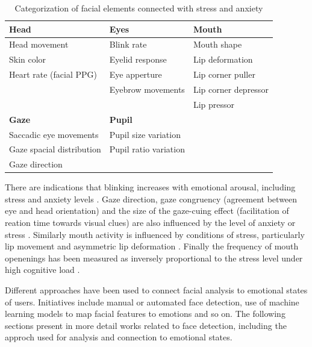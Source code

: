 \begin{table}[h]
\caption{Categorization of facial elements connected with stress and anxiety \parencite{giannakakis2017stress}}
\label{table:stress-facial-features}
\begin{tabular}{lll}%
\toprule%
\textbf{Head} & \textbf{Eyes} & \textbf{Mouth} \\
\midrule
Head movement & Blink rate & Mouth shape \\
Skin color & Eyelid response & Lip deformation  \\
Heart rate (facial PPG) & Eye apperture & Lip corner puller \\
& Eyebrow movements & Lip corner depressor \\
& & Lip pressor \\
\midrule
\textbf{Gaze} & \textbf{Pupil} & \\
\midrule
Saccadic eye movements & Pupil size variation &  \\
Gaze spacial distribution & Pupil ratio variation &  \\
Gaze direction & &\\
\bottomrule%
\end{tabular}%
\end{table}

There are indications that blinking increases with emotional arousal, including stress and anxiety levels \parencite{dinges2005optical}. Gaze direction, gaze congruency (agreement between eye and head orientation) and the size of the gaze-cuing effect (facilitation of reation time towards visual clues) are also influenced by the level of anxiety or stress \parencite{staab2014influence}. Similarly mouth activity is influenced by conditions of stress, particularly lip movement \parencite{dinges2005optical} and asymmetric lip deformation \parencite{metaxas2004image}. Finally the frequency of mouth openenings has been measured as inversely proportional to the stress level under high cognitive load \parencite{liao2005decision}.

Different approaches have been used to connect facial analysis to emotional states of users. Initiatives include manual or automated face detection, use of machine learning models to map facial features to emotions and so on. The following sections present in more detail works related to face detection, including the approch used for analysis and connection to emotional states.

